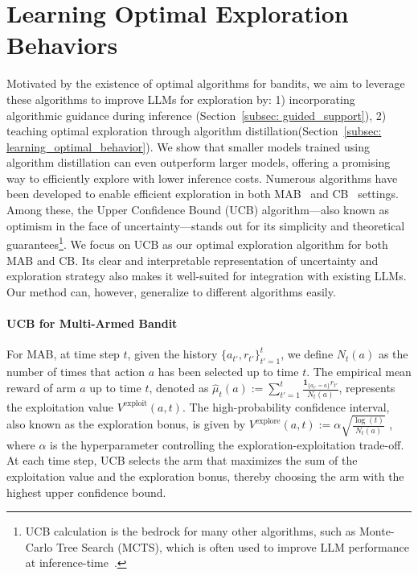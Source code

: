\documentclass[11pt, logo]{googledeepmind}
\newcommand{\ad}{algorithm distillation\xspace}
\theoremstyle{plain}
\theoremstyle{definition}
\begin{document}
\section{Learning Optimal Exploration Behaviors}
Motivated by the existence of optimal algorithms for bandits, we aim to leverage these algorithms to improve LLMs for exploration by:  1) incorporating algorithmic guidance during inference (Section~\ref{subsec: guided_support}),
2) teaching optimal exploration through \ad (Section~\ref{subsec: learning_optimal_behavior}). We show that smaller models trained using \ad can even outperform larger models, offering a promising way to efficiently explore with lower inference costs.
Numerous algorithms have been developed to enable efficient exploration in both MAB~\citep{auer2002finite} and CB~\citep{langford2007epoch,li2010contextual} settings. Among these, the Upper Confidence Bound (UCB) algorithm—also known as optimism in the face of uncertainty—stands out for its simplicity and theoretical guarantees\footnote{UCB calculation is the bedrock for many other algorithms, such as Monte-Carlo Tree Search (MCTS), which is often used to improve LLM performance at inference-time~\citep{snell2024scaling}.}.
We focus on UCB as our optimal exploration algorithm for both MAB and CB. Its clear and interpretable representation of uncertainty and exploration strategy also makes it well-suited for integration with existing LLMs. Our method can, however, generalize to different algorithms easily.
\paragraph{UCB for Multi-Armed Bandit}
For MAB, at time step $t$, given the history $\{a_{t'}, r_{t'}\}_{t'=1}^t$, we define $N_t(a)$ as the number of times that action $a$ has been selected up to time $t$. The empirical mean reward of arm $a$ up to time $t$, denoted as $\hat{\mu}_t(a):=\sum_{t'=1}^t \frac{\mathbf{1}_{\{a_{t'}=a\}}r_{t'}}{N_t(a)}$, represents the exploitation value $V^{\text{exploit}}(a,t)$. The high-probability confidence interval, also known as the exploration bonus, is given by $V^{\text{explore}}(a,t):=\alpha\sqrt{\frac{\log(t)}{N_t(a)}}$ , where $\alpha$ is the hyperparameter controlling the exploration-exploitation trade-off. At each time step, UCB selects the arm that maximizes the sum of the exploitation value and the exploration bonus, thereby choosing the arm with the highest upper confidence bound.
\end{document}

